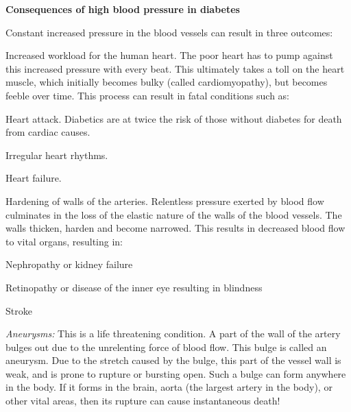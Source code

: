 
\textbf{Consequences of high blood pressure in diabetes}

Constant increased pressure in the blood vessels can result in three outcomes:

\item Increased workload for the human heart. The poor heart has to pump against this increased pressure with every beat. This ultimately takes a toll on the heart muscle, which initially becomes bulky (called cardiomyopathy), but becomes feeble over time. This process can result in fatal conditions such as:
 \item Heart attack. Diabetics are at twice the risk of those without diabetes for death from cardiac causes.

 \item Irregular heart rhythms.

 \item Heart failure.


 \item Hardening of walls of the arteries. Relentless pressure exerted by blood flow culminates in the loss of the elastic nature of the walls of the blood vessels. The walls thicken, harden and become narrowed. This results in decreased blood flow to vital organs, resulting in:
 \item Nephropathy or kidney failure

 \item Retinopathy or disease of the inner eye resulting in blindness

 \item Stroke


 \item \textit{Aneurysms:} This is a life threatening condition. A part of the wall of the artery bulges out due to the unrelenting force of blood flow. This bulge is called an aneurysm. Due to the stretch caused by the bulge, this part of the vessel wall is weak, and is prone to rupture or bursting open. Such a bulge can form anywhere in the body. If it forms in the brain, aorta (the largest artery in the body), or other vital areas, then its rupture can cause instantaneous death!


